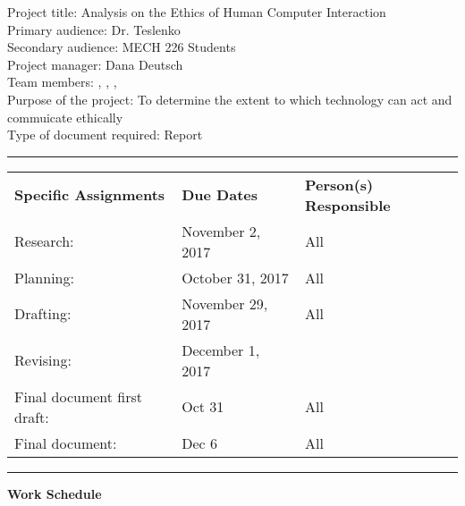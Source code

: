 \documentclass{article}
\newcommand\tab[1][1cm]{\hspace*{#1}}
\begin{document}
	\fancyhead{}
	\fancyfoot{}


	\noindent Project title: Analysis on the Ethics of Human Computer Interaction \\ %
	Primary audience: Dr. Teslenko \\
	Secondary audience: MECH 226 Students \\
	Project manager: Dana Deutsch \\
	Team members: \protect{}, \protect{}, \protect{}, \protect{}  \\
	Purpose of the project: To determine the extent to which technology can act and commuicate ethically\\
 	Type of document required: Report

	\noindent\rule{\textwidth}{0.4pt}

	\noindent\begin{tabularx}{\linewidth}{ L{4cm} L{4cm} l }
	   \textbf{Specific Assignments} & \textbf{Due Dates} & \textbf{Person(s) Responsible} \\
	   \tab[0.5cm] Research: & November 2, 2017 & All\\
	   \tab[0.5cm] Planning: & October 31, 2017 & All\\
	   \tab[0.5cm] Drafting: & November 29, 2017 & All\\
	   \tab[0.5cm] Revising: & December 1, 2017 & \\
	   \tab[0.5cm] Final document first \newline\tab[1cm] draft: & Oct 31 & All\\
	   \tab[0.5cm] Final document: & Dec 6 & All
	\end{tabularx}

	\noindent\rule{\textwidth}{0.4pt} 
	\textbf{Work Schedule}
\end{document}
